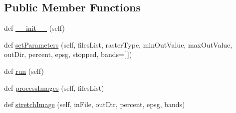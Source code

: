 \subsection*{Public Member Functions}
\begin{DoxyCompactItemize}
\item 
def \mbox{\hyperlink{class_dsg_tools_1_1_factories_1_1_thread_factory_1_1dpi_thread_1_1_dpi_thread_a2a5b506447f835fb034b6a833942a581}{\+\_\+\+\_\+init\+\_\+\+\_\+}} (self)
\item 
def \mbox{\hyperlink{class_dsg_tools_1_1_factories_1_1_thread_factory_1_1dpi_thread_1_1_dpi_thread_aa13c7c4b7d34745cedf701a8eee22d10}{set\+Parameters}} (self, files\+List, raster\+Type, min\+Out\+Value, max\+Out\+Value, out\+Dir, percent, epsg, stopped, bands=\mbox{[}$\,$\mbox{]})
\item 
def \mbox{\hyperlink{class_dsg_tools_1_1_factories_1_1_thread_factory_1_1dpi_thread_1_1_dpi_thread_a2ef6dd0533f1f3e9b3ffc0e83c2608c0}{run}} (self)
\item 
def \mbox{\hyperlink{class_dsg_tools_1_1_factories_1_1_thread_factory_1_1dpi_thread_1_1_dpi_thread_ada159a45dc2a9b778a75e1cc8756293a}{process\+Images}} (self, files\+List)
\item 
def \mbox{\hyperlink{class_dsg_tools_1_1_factories_1_1_thread_factory_1_1dpi_thread_1_1_dpi_thread_af78db3a3576b633a013f78a08e6fc93e}{stretch\+Image}} (self, in\+File, out\+Dir, percent, epsg, bands)
\end{DoxyCompactItemize}
